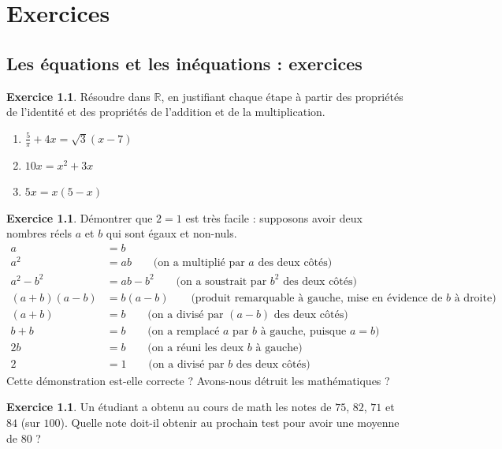 \documentclass[a4paper,13pt]{scrreprt}
\theoremstyle{plain}
\theoremstyle{definition}
\newtheorem{exo}[subsection]{Exercice}
\newcommand{\rr}{\mathbb{R}}
\begin{document}
\chapter{Exercices}

\section{Les équations et les inéquations : exercices}

\begin{exo} \label{exoei1}
	Résoudre dans $\rr$, en justifiant chaque étape à partir des propriétés de l'identité et des propriétés de l'addition et de la multiplication.
	\begin{enumerate}
		\item $\frac{5}{\pi} +4x = \sqrt{3}(x-7)$
		\item $10x = x^2 + 3x$
		\item $5x = x(5-x)$
	\end{enumerate}
\end{exo}

\begin{exo} \label{exoei8}
	Démontrer que $2=1$ est très facile : supposons avoir deux nombres réels $a$ et $b$ qui sont égaux et non-nuls.
	\begin{align*}
	a&=b \\
	a^2&=ab\text{~~~~~~(on a multiplié par $a$ des deux côtés)} \\
	a^2-b^2&=ab-b^2\text{~~~~~~(on a soustrait par $b^2$ des deux côtés)} \\
	(a+b)(a-b)&=b(a-b)\text{~~~~~~(produit remarquable à gauche, mise en évidence de $b$ à droite)} \\
	(a+b)&=b\text{~~~~~~(on a divisé par $(a-b)$ des deux côtés)} \\
	b+b&=b\text{~~~~~~(on a remplacé $a$ par $b$ à gauche, puisque $a=b$)} \\
	2b&=b\text{~~~~~~(on a réuni les deux $b$ à gauche)} \\
	2&=1\text{~~~~~~(on a divisé par $b$ des deux côtés)}
	\end{align*}
	Cette \og démonstration \fg{} est-elle correcte ? Avons-nous détruit les mathématiques ?
\end{exo}

\begin{exo} \label{exoei9}
	Un étudiant a obtenu au cours de math les notes de $75$, $82$, $71$ et $84$ (sur $100$). Quelle note doit-il obtenir au prochain test pour avoir une moyenne de $80$ ?
\end{exo}
\end{document}
